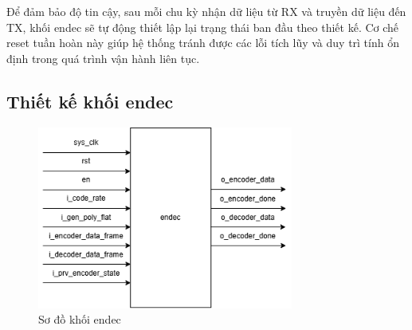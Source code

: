 \documentclass[../DoAn.tex]{subfiles}
\begin{document}
Để đảm bảo độ tin cậy, sau mỗi chu kỳ nhận dữ liệu từ RX và truyền dữ liệu đến TX, khối endec sẽ tự động thiết lập lại trạng thái ban đầu theo thiết kế. Cơ chế reset tuần hoàn này giúp hệ thống tránh được các lỗi tích lũy và duy trì tính ổn định trong quá trình vận hành liên tục.



\subsection{Thiết kế khối endec}

\begin{figure}[H]
    \centering
    \includegraphics[width=0.75\textwidth, height=0.2\textheight, keepaspectratio]{Hinhve/Chuong 4/endec.png}
    \caption{Sơ đồ khối endec}
\end{figure}
\end{document}
